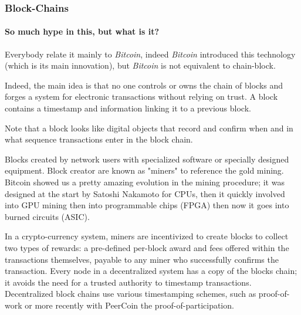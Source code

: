 
\subsubsection{Block-Chains}
\paragraph{So much hype in this, but what is it?}
Everybody relate it mainly to \textit{Bitcoin}\cite{SatoshiNakamoto2008Bitcoin:System}, indeed \textit{Bitcoin} introduced this technology (which is its main innovation), but \textit{Bitcoin} is not equivalent to chain-block.

Indeed, the main idea is that no one controls or owns the chain of blocks and forges a system for electronic transactions without relying on trust. A block contains a timestamp and information linking it to a previous block.

Note that a block looks like digital objects that record and confirm when and in what sequence transactions enter in the block chain. 

Blocks created by network users with specialized software or specially designed equipment. Block creator are known as "miners" to reference the gold mining. Bitcoin showed us a pretty amazing evolution in the mining procedure; it was designed at the start by Satoshi Nakamoto for CPUs, then it quickly involved into GPU mining then into programmable chips (FPGA) then now it goes into burned circuits (ASIC).

In a crypto-currency system, miners are incentivized to create blocks to collect two types of rewards: a pre-defined per-block award and fees offered within the transactions themselves, payable to any miner who successfully confirms the transaction.
Every node in a decentralized system has a copy of the blocks chain; it avoids the need for a trusted authority to timestamp transactions. Decentralized block chains use various timestamping schemes, such as proof-of-work or more recently with PeerCoin the proof-of-participation.

